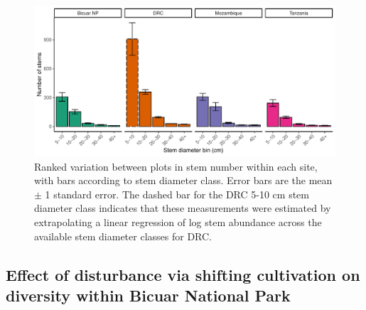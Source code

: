 \begin{refsection}
\begin{figure}
	\includegraphics[width=\textwidth]{img/stem_ab_dbh_bin_group}
	\caption[Bar plots of stem diameter abundance within each site]{Ranked variation between plots in stem number within each site, with bars according to stem diameter class. Error bars are the mean $\pm$ 1 standard error. The dashed bar for the DRC 5-10 cm stem diameter class indicates that these measurements were estimated by extrapolating a linear regression of log stem abundance across the available stem diameter classes for DRC.}
	\label{bicuar:stem_ab_dbh_bin}
\end{figure}

\subsection{Effect of disturbance via shifting cultivation on diversity within Bicuar National Park}
\label{bicuar:ssec:disturbance}


\end{refsection}
